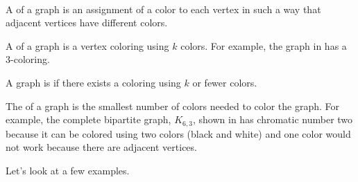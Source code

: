\begin{defn}
\label{defn_chromatic_number}
~
    \begin{apart}
        \item A  of a graph is an assignment of a color to each vertex in such a way that adjacent vertices have different colors. 
        \item A  of a graph is a vertex coloring using $k$ colors.  For example, the graph in  has a 3-coloring.
        \item A graph is  if there exists a coloring using $k$ or fewer colors.
        \item The  of a graph is the smallest number of colors needed to color the graph.  For example, the complete bipartite graph, $K_{6,3}$, shown in  has chromatic number two because it can be colored using two colors (black and white) and one color would not work because there are adjacent vertices. 
    \end{apart}
\end{defn}

Let's look at a few examples.

